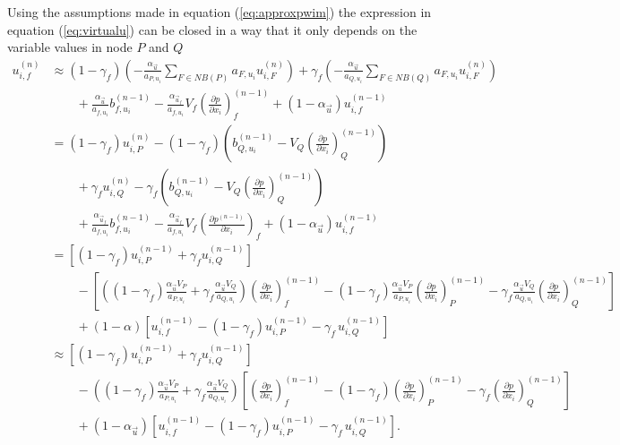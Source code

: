   Using the assumptions made in equation (\ref{eq:approxpwim}) the expression in equation (\ref{eq:virtualu}) can be closed in a way that it only depends on the variable values in node \(P\) and \(Q\)
  \begin{align}
    \label{eq:closepwim}
    u_{i,f}^{(n)} 
    &\approx 
    \left(1-\gamma_f\right)  \left( -\frac{\alpha_\vec{u}}{a_{P,u_i}} \sum_{F \in NB(P)} a_{F,u_i} u_{i,F}^{(n)} \right)
    +\gamma_f  \left( -\frac{\alpha_\vec{u}}{a_{Q,u_i}} \sum_{F \in NB(Q)} a_{F,u_i} u_{i,F}^{(n)}  \right) \nonumber \\[1em]
    &\quad\quad+ \frac{\alpha_\vec{u}}{a_{f,u_i}}b_{f,u_i}^{(n-1)} 
    - \frac{\alpha_{\vec{u}_f}}{a_{f,u_i}}V_f\left(\frac{\partial p}{\partial x_i}\right)_f^{(n-1)} 
    + \left(1 - \alpha_{\vec{u}}\right) u_{i,f}^{(n-1)} \nonumber \\[1em]
    &=
    \left(1-\gamma_f\right) u_{i,P}^{(n)} - \left(1 - \gamma_f\right) \left(  b_{Q,u_i}^{(n-1)} - V_Q \left(\frac{\partial p}{\partial x_i}\right)_Q^{(n-1)} \right) \nonumber \\[1em]
    &\quad\quad+\gamma_f  u_{i,Q}^{(n)} - \gamma_f\left( b_{Q,u_i}^{(n-1)} - V_Q \left(\frac{\partial p}{\partial x_i}\right)_Q^{(n-1)}  \right) \nonumber \\[1em]
    &\quad\quad+ \frac{\alpha_{\vec{u}_f}}{a_{f,u_i}}b_{f,u_i}^{(n-1)} 
    - \frac{\alpha_{\vec{u}_f}}{a_{f,u_i}}V_f\left(\frac{\partial p^{(n-1)}}{\partial x_i}\right)_f 
    + \left(1 - \alpha_{\vec{u}}\right) u_{i,f}^{(n-1)} \nonumber\\[1em]
    &=
    \left[\left(1 - \gamma_f\right) u_{i,P}^{(n-1)} + \gamma_f u_{i,Q}^{(n-1)} \right] \nonumber\\[1em]
    &\quad\quad - 
    \left[ 
    \left(\left(1 - \gamma_f\right) \frac{\alpha_\vec{u} V_P}{a_{P,u_i}} + \gamma_f \frac{\alpha_\vec{u} V_Q}{a_{Q,u_i}}\right)
    \left(\frac{\partial p}{\partial x_i}\right)_f^{(n-1)} 
    - \left(1 - \gamma_f \right) \frac{\alpha_\vec{u} V_P}{a_{P,u_i}}\left( \frac{\partial p}{\partial x_i} \right)_P^{(n-1)} 
    - \gamma_f \frac{\alpha_\vec{u} V_Q}{a_{Q,u_i}}\left(\frac{\partial p}{\partial x_i}\right)_Q^{(n-1)}
    \right] \nonumber \\[1em]
    &\quad\quad + \left(1 - \alpha\right) \left[ u_{i,f}^{(n-1)} - \left(1 - \gamma_f\right) u_{i,P}^{(n-1)} - \gamma_f \, u_{i,Q}^{(n-1)} \right] \nonumber \\[1em]
    &\approx
    \left[\left(1 - \gamma_f\right) u_{i,P}^{(n-1)} + \gamma_f u_{i,Q}^{(n-1)} \right] \nonumber\\[1em]
    &\quad\quad - 
    \left(\left(1 - \gamma_f\right) \frac{\alpha_\vec{u} V_P}{a_{P,u_i}} + \gamma_f \frac{\alpha_\vec{u} V_Q}{a_{Q,u_i}}\right)
    \left[ 
    \left(\frac{\partial p}{\partial x_i}\right)_f^{(n-1)} 
    - \left(1 - \gamma_f \right) \left( \frac{\partial p}{\partial x_i} \right)_P^{(n-1)} 
    - \gamma_f \left(\frac{\partial p}{\partial x_i}\right)_Q^{(n-1)}
    \right] \nonumber \\[1em]
    &\quad\quad + \left(1 - \alpha_\vec{u}\right) \left[ u_{i,f}^{(n-1)} - \left(1 - \gamma_f\right) u_{i,P}^{(n-1)} - \gamma_f \, u_{i,Q}^{(n-1)} \right].
  \end{align}
